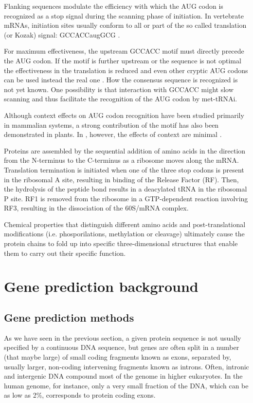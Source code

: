 Flanking sequences modulate the efficiency with which the AUG codon is
recognized as a stop signal during the scanning phase of
initiation. In vertebrate mRNAs, initiation sites usually conform to
all or part of the so called translation (or Kozak) signal:
GCCACCaugGCG \citep{kozak:1987a}.

For maximum effectiveness, the upstream GCCACC motif must directly
precede the AUG codon. If the motif is further upstream or the
sequence is not optimal the effectiveness in the translation is
reduced and even other cryptic AUG codons can be used instead the real
one \citep{kozak:1999a}. How the consensus sequence is recognized is
not yet known. One possibility is that interaction with GCCACC might
slow scanning and thus facilitate the recognition of the AUG codon by
met-tRNAi.

Although context effects on AUG codon recognition have been studied
primarily in mammalian systems, a strong contribution of the motif
has also been demonstrated in plants. In \Sc, however, the effects
of context are minimal \citep{kozak:1999a}.

Proteins are assembled by the sequential addition of amino acids in
the direction from the N-terminus to the C-terminus as a ribosome
moves along the mRNA. Translation termination is initiated when one of
the three stop codons is present in the ribosomal A site, resulting in
binding of the Release Factor (RF). Then, the hydrolysis of the
peptide bond results in a deacylated tRNA in the ribosomal P site. RF1
is removed from the ribosome in a GTP-dependent reaction involving
RF3, resulting in the dissociation of the 60S/mRNA complex.

Chemical properties that distinguish different amino acids and
post-translational modifications (i.e. phosporilations, methylation or
cleavage) ultimately cause the protein chains to fold up into specific
three-dimensional structures that enable them to carry out their
specific function.


\section{Gene prediction background}

\subsection{Gene prediction methods}

As we have seen in the previous section, a given protein sequence is
not usually specified by a continuous DNA sequence, but genes are
often split in a number (that maybe large) of small coding fragments
known as exons, separated by, usually larger, non-coding intervening
fragments known as introns. Often, intronic and intergenic DNA
compound most of the genome in higher eukaryotes. In the human genome,
for instance, only a very small fraction of the DNA, which can be as
low as 2\%, corresponds to protein coding exons.

